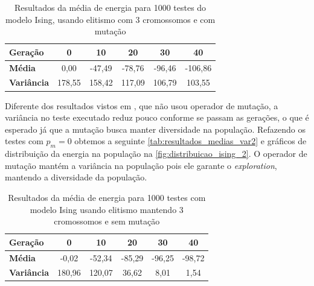 \begin{table}[h!]
	\centering
	\begin{tabular}{|l|c|c|c|c|c|}
		\hline
		\textbf{Geração}   & \textbf{0} & \textbf{10} & \textbf{20} & \textbf{30} & \textbf{40} \\ \hline
		\textbf{Média}     & 0,00       & -47,49      & -78,76      & -96,46      & -106,86      \\ \hline
		\textbf{Variância} & 178,55     & 158,42      & 117,09       & 106,79       & 103,55       \\ \hline
	\end{tabular}
	\caption{Resultados da média de energia para 1000 testes do modelo Ising, usando elitismo com 3 cromossomos e com mutação }
	\label{tab:resultados_medias_var}
\end{table}


Diferente dos resultados vistos em , que não usou operador de mutação, a variância no teste executado reduz pouco conforme se passam as gerações, o que é esperado já que a mutação busca manter diversidade na população. Refazendo os testes com \(p_m = 0\) obtemos a seguinte \autoref{tab:resultados_medias_var2} e gráficos de distribuição da energia na população na \autoref{fig:distribuicao_ising_2}. O operador de mutação mantém a variância na população pois ele garante o \textit{exploration}, mantendo a diversidade da população.

\begin{table}[h!]
	\centering
	\begin{tabular}{|l|c|c|c|c|c|}
		\hline
		\textbf{Geração}   & \textbf{0} & \textbf{10} & \textbf{20} & \textbf{30} & \textbf{40} \\ \hline
		\textbf{Média}     & -0,02       & -52,34      & -85,29      & -96,25      & -98,72      \\ \hline
		\textbf{Variância} & 180,96     & 120,07      & 36,62       & 8,01       & 1,54       \\ \hline
	\end{tabular}
	\caption{Resultados da média de energia para 1000 testes com modelo Ising usando elitismo mantendo 3 cromossomos e sem mutação}
	\label{tab:resultados_medias_var2}
\end{table}


